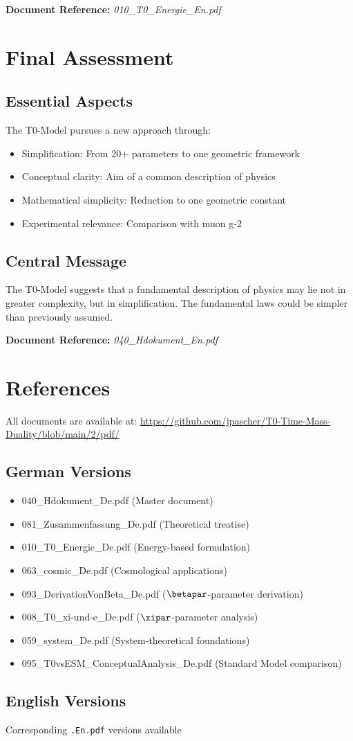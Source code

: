 \textbf{Document Reference:} \textit{010\_T0\_Energie\_En.pdf}

\section{Final Assessment}

\subsection{Essential Aspects}

The T0-Model pursues a new approach through:

\begin{itemize}
	\item Simplification: From 20+ parameters to one geometric framework
	\item Conceptual clarity: Aim of a common description of physics
	\item Mathematical simplicity: Reduction to one geometric constant
	\item Experimental relevance: Comparison with muon g-2
\end{itemize}

\subsection{Central Message}

The T0-Model suggests that a fundamental description of physics may lie not in greater complexity, but in simplification. The fundamental laws could be simpler than previously assumed.

\textbf{Document Reference:} \textit{040\_Hdokument\_En.pdf}

\section{References}

All documents are available at: \url{https://github.com/jpascher/T0-Time-Mass-Duality/blob/main/2/pdf/}

\subsection{German Versions}

\begin{itemize}
	\item 040\_Hdokument\_De.pdf (Master document)
	\item 081\_Zusammenfassung\_De.pdf (Theoretical treatise)
	\item 010\_T0\_Energie\_De.pdf (Energy-based formulation)
	\item 063\_cosmic\_De.pdf (Cosmological applications)
	\item 093\_DerivationVonBeta\_De.pdf ($\betapar$-parameter derivation)
	\item 008\_T0\_xi-und-e\_De.pdf ($\xipar$-parameter analysis)
	\item 059\_system\_De.pdf (System-theoretical foundations)
	\item 095\_T0vsESM\_ConceptualAnalysis\_De.pdf (Standard Model comparison)
\end{itemize}

\subsection{English Versions}

Corresponding \texttt{.En.pdf} versions available